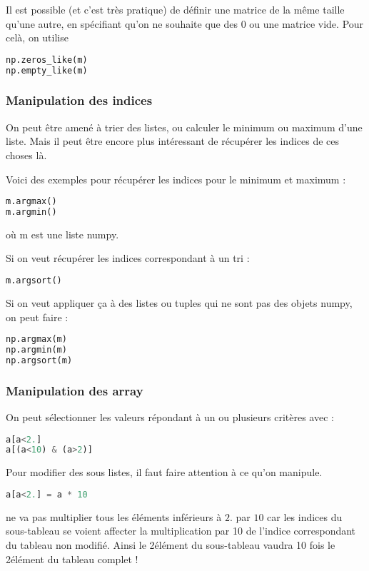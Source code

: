 \documentclass[a4paper,twoside]{article}
\begin{document}
Il est possible (et c'est très pratique) de définir une matrice de la même taille qu'une autre, en spécifiant qu'on ne souhaite que des 0 ou une matrice vide. Pour celà, on utilise
\begin{lstlisting}[language=python]
np.zeros_like(m)
np.empty_like(m)
\end{lstlisting}

\subsubsection{Manipulation des indices}
On peut être amené à trier des listes, ou calculer le minimum ou maximum d'une liste. Mais il peut être encore plus intéressant de récupérer les indices de ces choses là. 

Voici des exemples pour récupérer les indices pour le minimum et maximum : 
\begin{lstlisting}[language=python]
m.argmax()
m.argmin()
\end{lstlisting}
où m est une liste numpy.

Si on veut récupérer les indices correspondant à un tri : 
\begin{lstlisting}[language=python]
m.argsort()
\end{lstlisting}

\bigskip

Si on veut appliquer ça à des listes ou tuples qui ne sont pas des objets numpy, on peut faire : 
\begin{lstlisting}[language=python]
np.argmax(m)
np.argmin(m)
np.argsort(m)
\end{lstlisting}

\subsubsection{Manipulation des array}
On peut sélectionner les valeurs répondant à un ou plusieurs critères avec :
\begin{lstlisting}[language=python]
a[a<2.]
a[(a<10) & (a>2)]
\end{lstlisting}

Pour modifier des sous listes, il faut faire attention à ce qu'on manipule. 

\begin{lstlisting}[language=python]
a[a<2.] = a * 10
\end{lstlisting}
ne va pas multiplier tous les éléments inférieurs à $2.$ par $10$ car les indices du sous-tableau se voient affecter la multiplication par 10 de l'indice correspondant du tableau non modifié. Ainsi le 2\ieme élément du sous-tableau vaudra 10 fois le 2\ieme élément du tableau complet !
\end{document}
